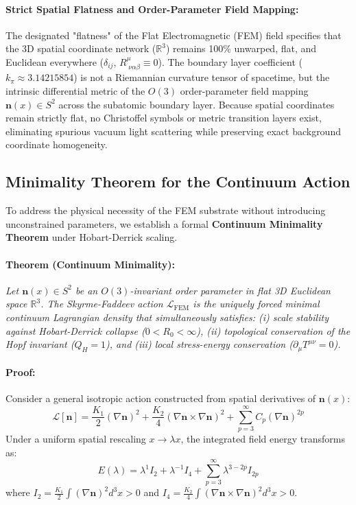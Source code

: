 \documentclass[11pt,a4paper]{article}
\begin{document}
	\paragraph{Strict Spatial Flatness and Order-Parameter Field Mapping:}
	The designated "flatness" of the Flat Electromagnetic (FEM) field specifies that the 3D spatial coordinate network ($\mathbb{R}^3$) remains 100\% unwarped, flat, and Euclidean everywhere ($\delta_{ij}$, $R^\mu_{\;\nu\alpha\beta} \equiv 0$). The boundary layer coefficient ($k_\pi \approx 3.14215854$) is not a Riemannian curvature tensor of spacetime, but the intrinsic differential metric of the $O(3)$ order-parameter field mapping $\mathbf{n}(x) \in S^2$ across the subatomic boundary layer. Because spatial coordinates remain strictly flat, no Christoffel symbols or metric transition layers exist, eliminating spurious vacuum light scattering while preserving exact background coordinate homogeneity.
	
	\subsection{Minimality Theorem for the Continuum Action}
	To address the physical necessity of the FEM substrate without introducing unconstrained parameters, we establish a formal \textbf{Continuum Minimality Theorem} under Hobart-Derrick scaling.
	
	\paragraph{Theorem (Continuum Minimality):}
	\textit{Let $\mathbf{n}(x) \in S^2$ be an $O(3)$-invariant order parameter in flat 3D Euclidean space $\mathbb{R}^3$. The Skyrme-Faddeev action $\mathcal{L}_{\text{FEM}}$ is the uniquely forced minimal continuum Lagrangian density that simultaneously satisfies: (i) scale stability against Hobart-Derrick collapse ($0 < R_0 < \infty$), (ii) topological conservation of the Hopf invariant ($Q_H = 1$), and (iii) local stress-energy conservation ($\partial_\mu T^{\mu\nu} = 0$).}
	
	\paragraph{Proof:}
	Consider a general isotropic action constructed from spatial derivatives of $\mathbf{n}(x)$:
	\begin{equation}
		\mathcal{L}[\mathbf{n}] = \frac{K_1}{2} (\nabla \mathbf{n})^2 + \frac{K_2}{4} (\nabla \mathbf{n} \times \nabla \mathbf{n})^2 + \sum_{p=3}^{\infty} C_p (\nabla \mathbf{n})^{2p}
	\end{equation}
	Under a uniform spatial rescaling $x \to \lambda x$, the integrated field energy transforms as:
	\begin{equation}
		E(\lambda) = \lambda^{1} I_2 + \lambda^{-1} I_4 + \sum_{p=3}^{\infty} \lambda^{3-2p} I_{2p}
	\end{equation}
	where $I_2 = \frac{K_1}{2} \int (\nabla \mathbf{n})^2 d^3x > 0$ and $I_4 = \frac{K_2}{4} \int (\nabla \mathbf{n} \times \nabla \mathbf{n})^2 d^3x > 0$. 
	
\end{document}
